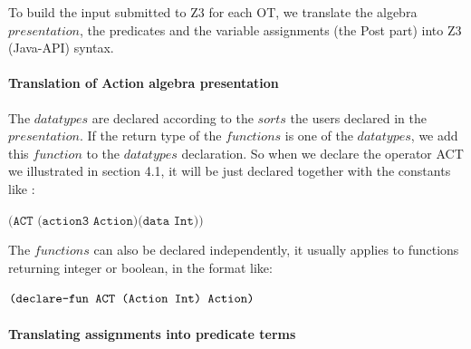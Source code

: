 \documentclass{lncs/llncs}
\newcommand{\OTvar}{\texttt}
\begin{document}
To build the input submitted to Z3 for each OT,
we translate the algebra $presentation$, the predicates and the
variable assignments (the Post part) into Z3 (Java-API) syntax.

\paragraph{Translation of Action algebra presentation}

The $datatypes$ are declared according to the $sorts$ the users
declared in the $presentation$. If the return type of the $functions$
is one of the $datatypes$, we add this $function$ to the $datatypes$ declaration.
So when we declare the operator ACT we illustrated in section 4.1, it
will be just declared together with the constants like :\\
\centerline{$\OTvar{(ACT\ (action3\ Action)(data\ Int))}$}

The $functions$ can also be declared independently, it usually applies to functions returning integer or boolean, in the format like:\\
\centerline{$\OTvar{(declare\text{-}fun\ ACT\ (Action\ Int)\ Action)}$}

%
%
%

\paragraph{Translating assignments into predicate terms}
\end{document}
